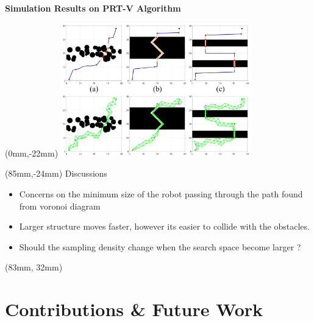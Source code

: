 \documentclass[11pt,aspectratio=169]{beamer}
\begin{document}
\begin{frame}[fragile]{\textbf{Simulation Results on PRT-V Algorithm}}
    
        \begin{textblock*}{5cm}(0mm,-22mm) %
        \href{https://youtu.be/MB3nqaDeuyU?si=1ECQ7Ujp21Hg77ce&t=5}{
        \includegraphics[height=58mm]{elements/[24]-PRT-V.png}}
        \end{textblock*}

        \begin{textblock*}{45mm}(85mm,-24mm)
        Discussions
        \vspace{2mm}
        \begin{itemize}
            \item Concerns on the minimum size of the robot passing through the path found from voronoi diagram
            \item Larger structure moves faster, however its easier to collide with the obstacles.
            \item Should the sampling density change when the search space become larger ? 
        \end{itemize}
        \end{textblock*}

        \begin{textblock*}{5cm}(83mm, 32mm) %
        {\tiny \cite{9477154}}
        \end{textblock*}


\end{frame}


\section{Contributions \& Future Work}
\end{document}

